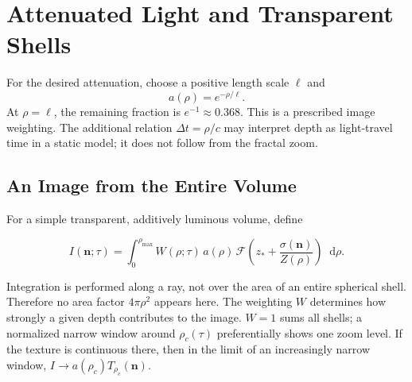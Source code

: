 \documentclass[11pt,a4paper]{article}
\numberwithin{equation}{section}
\newcommand{\vct}[1]{\boldsymbol{#1}}
\newcommand{\F}{\mathcal F}
\newcommand{\dd}{\mathop{}\!\mathrm d}
\begin{document}
\newpage
\section{Attenuated Light and Transparent Shells}
For the desired attenuation, choose a positive length scale $\ell$ and
\begin{equation}\label{eq:attenuation}
 a(\rho)=e^{-\rho/\ell}.
\end{equation}
At $\rho=\ell$, the remaining fraction is $e^{-1}\approx0.368$.
This is a prescribed image weighting. The additional relation $\Delta t=\rho/c$
may interpret depth as light-travel time in a static model; it does not follow from
the fractal zoom.

\begin{center}
\end{center}

\subsection{An Image from the Entire Volume}
For a simple transparent, additively luminous volume, define
\begin{modelbox}
\begin{equation}\label{eq:integral}
 I(\vct n;\tau)=\int_0^{\rho_{\max}}
 W(\rho;\tau)\,a(\rho)\,
 \F\!\left(z_\ast+\frac{\sigma(\vct n)}{Z(\rho)}\right)\dd\rho.
\end{equation}
\end{modelbox}
Integration is performed along a ray, not over the area of an entire spherical shell.
Therefore no area factor $4\pi\rho^2$ appears here. The weighting $W$ determines how
strongly a given depth contributes to the image. $W=1$ sums all shells; a normalized
narrow window around $\rho_c(\tau)$ preferentially shows one zoom level. If the
texture is continuous there, then in the limit of an increasingly narrow window,
$I\to a(\rho_c)T_{\rho_c}(\vct n)$.
\end{document}
